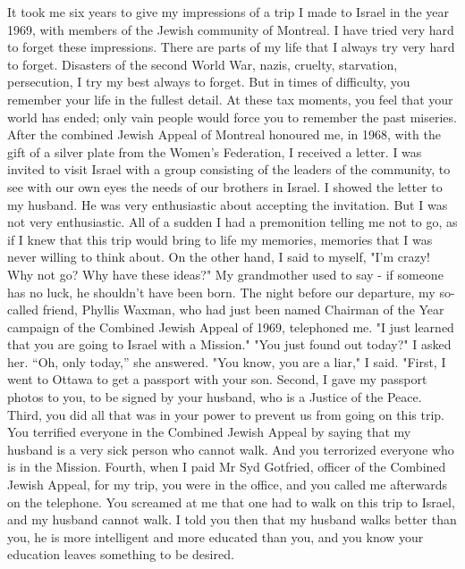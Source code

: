 
It took me six years to give my impressions of a trip I made  to Israel in the year 1969, with members of the Jewish community of Montreal.
I have tried very hard to forget these impressions.
There are parts of my life that I always try very hard to forget.
Disasters of the second World War, nazis, cruelty, starvation, persecution, I try my best always to forget.
But in times of difficulty, you remember your life in the fullest detail.
At these tax moments, you feel that your world has ended; only vain people would force you to remember the past miseries.
After the combined Jewish Appeal of Montreal honoured me, in 1968, with the gift of a silver plate from the Women's Federation, I received a letter.
I was invited to visit Israel with a group consisting of the leaders of the community, to see with our own eyes the needs of our brothers in Israel.
I showed the letter to my husband.
He was very enthusiastic about accepting the invitation.
But I was not very enthusiastic.
All of a sudden I had a premonition telling me not to go, as if I knew that this trip would bring to life my memories, memories that I was never willing to think about.
On the other hand, I said to myself, "I'm crazy!
Why not go?
Why have these ideas?"
My grandmother used to say  - if someone has no luck, he shouldn't have been born.
The night before our departure, my so-called friend, Phyllis Waxman, who had just been named Chairman of the Year campaign of the Combined Jewish Appeal of 1969, telephoned me.
"I just learned that you are going to Israel with a Mission."
"You just found out today?"
I asked her.
“Oh, only today,” she answered.
"You know, you are a liar," I said.
"First, I went to Ottawa to get a passport with your son.
Second, I gave my passport photos to you, to be signed by your husband, who is a Justice of the Peace.
Third, you did all that was in your power to prevent us from going on this trip.
You terrified everyone in the Combined 
Jewish Appeal by saying that my husband is a very sick person who cannot walk.
And you terrorized everyone who is in the Mission.
Fourth, when I paid Mr Syd Gotfried, officer of the Combined Jewish Appeal, for my trip, you were in the office, and you called me afterwards on the telephone.
You screamed at me that one had to  walk on this trip to Israel, and my husband cannot walk.
I told you then that my husband walks better than you, he is more intelligent and more educated than you, and you know your education leaves something to be desired.

